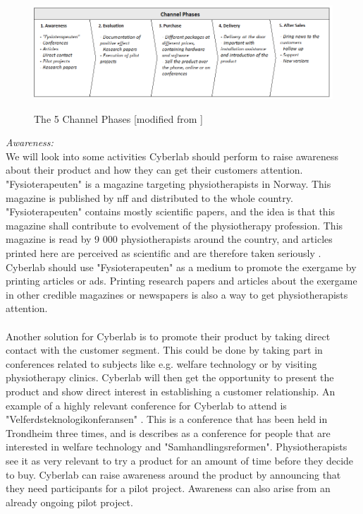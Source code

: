 \begin{figure}
\centering
\scalebox{0.60}
{\includegraphics{channels}}
\caption[The 5 Channel Phases]{The 5 Channel Phases [modified from \cite{osterwalder}\cite{osterwalderthesis}]}
\label{fig:Channels}
\end{figure}

\emph{Awareness:} \\ 
We will look into some activities Cyberlab should perform to raise awareness about their product and how they can get their customers attention. "Fysioterapeuten" is a magazine targeting physiotherapists in Norway. This magazine is published by \ac{nff} and distributed to the whole country. "Fysioterapeuten" contains mostly scientific papers, and the idea is that this magazine shall contribute to evolvement of the physiotherapy profession. This magazine is read by 9 000 physiotherapists around the country, and articles printed here are perceived as scientific and are therefore taken seriously \cite{fysioomoss}. Cyberlab should use "Fysioterapeuten" as a medium to promote the exergame by printing articles or ads. Printing research papers and articles about the exergame in other credible magazines or newspapers is also a way to get physiotherapists attention. \\ \\
Another solution for Cyberlab is to promote their product by taking direct contact with the customer segment. This could be done by taking part in conferences related to subjects like e.g. welfare technology or by visiting physiotherapy clinics. Cyberlab will then get the opportunity to present the product and show direct interest in establishing a customer relationship. An example of a highly relevant conference for Cyberlab to attend is "Velferdsteknologikonferansen" \cite{conference}. This is a conference that has been held in Trondheim three times, and is describes as a conference for people that are interested in welfare technology and "Samhandlingsreformen". Physiotherapists see it as very relevant to try a product for an amount of time before they decide to buy. Cyberlab can raise awareness around the product by announcing that they need participants for a pilot project. Awareness can also arise from an already ongoing pilot project. \\ \\
